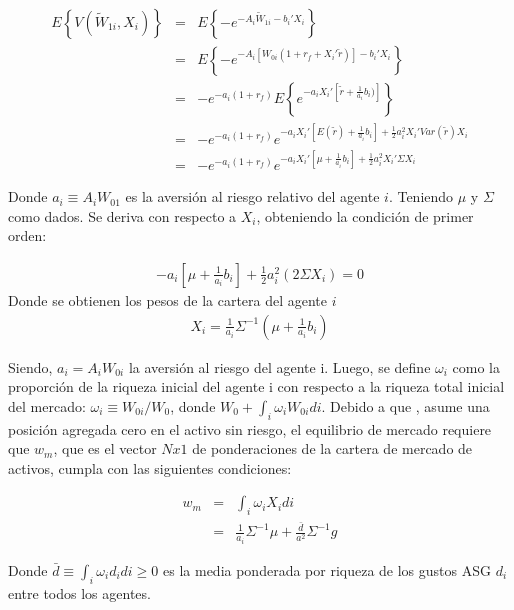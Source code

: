 \begin{eqnarray}
 E\left\lbrace V(\tilde W_{1i}, X_i) \right\rbrace &=& E\left\lbrace-e^{-A_i\tilde W_{1i}-b_i'X_i} \right\rbrace\nonumber\\
 &=& E\left\lbrace-e^{-A_i\left[W_{0i}(1 + r_f + X_i' \tilde r)\right]-b_i'X_i} \right\rbrace\nonumber\\
 &=& -e^{-a_i(1+r_f)}E\left\lbrace e^{-a_iX_i'\left[\tilde r + \frac{1}{a_i}b_i)\right]}\right\rbrace\nonumber\\
 &=& -e^{-a_i(1+r_f)} e^{-a_iX_i'\left[E(\tilde r)+\frac{1}{a_i}b_i\right]+\frac{1}{2}a_i^{2}X_i'Var(\tilde r)X_i}\nonumber\\
 &=& -e^{-a_i(1+r_f)} e^{-a_iX_i'\left[\mu+\frac{1}{a_i}b_i\right]+\frac{1}{2}a_i^{2}X_i'\Sigma X_i}
\end{eqnarray}

Donde $a_i \equiv A_iW_{01}$ es la aversión al riesgo relativo del agente $i$. Teniendo $\mu$ y $\Sigma$ como dados. Se deriva con respecto a $X_i$, obteniendo la condición de primer orden:

\begin{eqnarray}
-a_i\left[\mu + \frac{1}{a_i}b_i\right]+\frac{1}{2}a_i^{2}(2\Sigma X_i) = 0
\end{eqnarray}
Donde se obtienen los pesos de la cartera del agente $i$
\begin{eqnarray}
X_i=\frac{1}{a_i} \Sigma^{-1}\left(\mu + \frac{1}{a_i} b_i\right)
\end{eqnarray}

Siendo, $a_i = A_iW_{0i}$ la aversión al riesgo del agente i. Luego, se define $\omega_i$ como la proporción de la riqueza inicial del agente i con respecto a la riqueza total inicial del mercado: $\omega_i \equiv W_{0i}/W_0$, donde $W_0 + \int_i\omega_iW_{0i}di$. Debido a que , asume una posición agregada cero en el activo sin riesgo, el equilibrio de mercado requiere que $w_m$, que es el vector $N x 1$ de ponderaciones de la cartera de mercado de activos, cumpla con las siguientes condiciones:

\begin{eqnarray}
 w_m&=&\int_i\omega_iX_idi\nonumber\\
&=& \frac{1}{a_i} \Sigma^{-1}\mu+ \frac{\bar d}{a^2} \Sigma^{-1}g  
\end{eqnarray}

Donde $\bar d \equiv \int_i\omega_i d_idi \geq 0$  es la media ponderada por riqueza de los gustos ASG $d_i$ entre todos los agentes.

